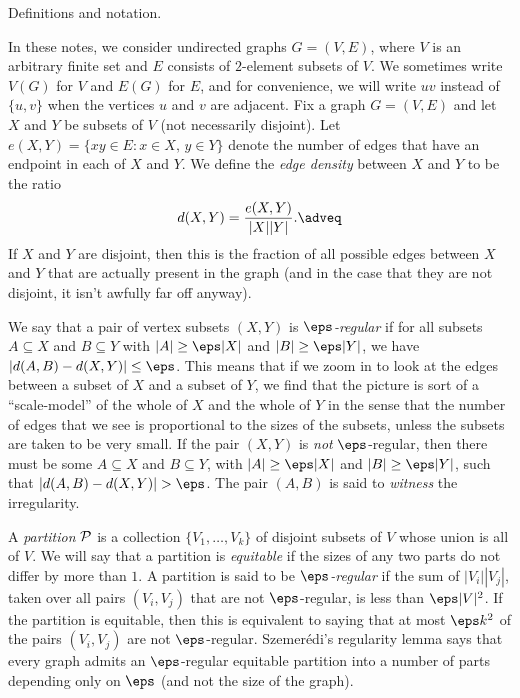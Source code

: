 


\def\P{{\cal P}}
\def\Q{{\cal Q}}
\def\R{{\cal R}}
\def\given{\,|\;}
\def\zed#1{{\bf Z}/#1{\bf Z}}

\classicmode
{}

\advsect Definitions and notation.

In these notes, we consider undirected graphs $G = (V,E)$, where $V$ is an arbitrary finite set and $E$ consists
of $2$-element subsets of $V$. We sometimes write $V(G)$ for $V$ and $E(G)$ for $E$, and for convenience, we will
write $uv$ instead of $\{u,v\}$ when the vertices $u$ and $v$ are adjacent.
Fix a graph $G=(V,E)$ and let $X$ and $Y$ be subsets of $V$ (not necessarily
disjoint). Let $e(X,Y) = \{xy \in E : x\in X,\,y\in Y\}$ denote the number of edges that have an endpoint
in each of $X$ and $Y$. We define the {\it edge density} between $X$ and $Y$ to be the ratio
$$d(X,Y) = {e(X,Y)\over |X||Y|}.\adveq$$
If $X$ and $Y$ are disjoint, then this is the fraction of all possible edges between $X$ and $Y$ that are
actually present in the graph (and in the case that they are not disjoint, it isn't awfully far off anyway).

We say that a pair of vertex subsets $(X,Y)$ is {\it $\eps$-regular} if for all subsets $A\subseteq X$ and
$B\subseteq Y$ with $|A|\geq \eps|X|$ and $|B|\geq \eps|Y|$, we have $|d(A,B)- d(X,Y)|\leq \eps$. This means that
if we zoom in to look at the edges between a subset of $X$ and a subset of $Y$, we find that the picture is sort of
a ``scale-model'' of the whole of $X$ and the whole of $Y$ in the sense that the number of edges that
we see is proportional to the sizes of the subsets, unless the subsets are taken to be very small. If the pair
$(X,Y)$ is {\it not} $\eps$-regular, then there must be some $A\subseteq X$ and $B\subseteq Y$, with
$|A|\geq \eps|X|$ and $|B| \geq \eps|Y|$, such that $|d(A,B)-d(X,Y)|>\eps$. The pair $(A,B)$ is said to
{\it witness} the irregularity.

A {\it partition} $\P$ is a collection $\{V_1,\ldots,V_k\}$ of disjoint subsets of $V$ whose union is all of $V$.
We will say that a partition is {\it equitable} if the sizes of any two parts do not differ by more than $1$.
A partition is said to be {\it $\eps$-regular} if the sum of $|V_i||V_j|$, taken over all pairs $(V_i,V_j)$
that are not $\eps$-regular, is less than $\eps |V|^2$. If the partition is equitable, then this is equivalent
to saying that at most $\eps k^2$ of the pairs $(V_i,V_j)$ are not $\eps$-regular. Szemer\'edi's regularity
lemma says that every graph admits an $\eps$-regular equitable partition into a number of parts depending
only on $\eps$ (and not the size of the graph).

